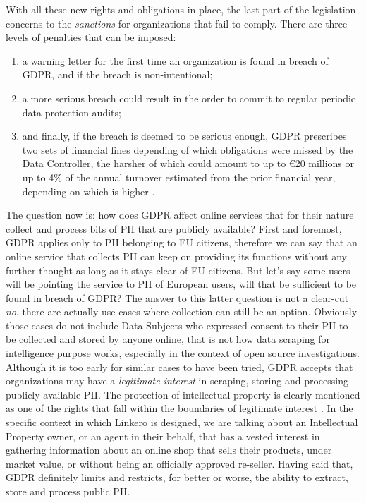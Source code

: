 With all these new rights and obligations in place, the last part of the
legislation concerns to the \emph{sanctions} for organizations that fail to
comply. There are three levels of penalties that can be imposed:
\begin{enumerate}
  \item a warning letter for the first time an organization is found in breach
  of GDPR, and if the breach is non-intentional;
  \item a more serious breach could result in the order to commit to regular
  periodic data protection audits;
  \item and finally, if the breach is deemed to be serious enough, GDPR
  prescribes two sets of financial fines depending of which obligations were
  missed by the Data Controller, the harsher of which could amount to up to
  \euro20 millions or up to 4\% of the annual turnover estimated from the prior
  financial year, depending on which is higher \cite{EU18}.
\end{enumerate}

The question now is: how does GDPR affect online services that for their
nature collect and process bits of PII that are publicly available? First and
foremost, GDPR applies only to PII belonging to EU citizens, therefore we can say
that an online service that collects PII can keep on providing its functions
without any further thought as long as it stays clear of EU citizens. But let's
say some users will be pointing the service to PII of European users, will that
be sufficient to be found in breach of GDPR? The answer to this latter question
is not a clear-cut \emph{no}, there are actually use-cases where collection can
still be an option. Obviously those cases do not include Data Subjects
who expressed consent to their PII to be collected and stored by anyone online,
that is not how data scraping for intelligence purpose works, especially in the
context of open source investigations. Although it is too early for similar
cases to have been tried, GDPR accepts that organizations may have a
\emph{legitimate interest} in scraping, storing and processing publicly
available PII. The protection of intellectual property is clearly
mentioned as one of the rights that fall within the boundaries of legitimate
interest \cite{EU18}. In the specific context in which Linkero is designed, we
are talking about an Intellectual Property owner, or an agent in their behalf,
that has a vested interest in gathering information about an online shop that
sells their products, under market value, or without being an officially
approved re-seller. Having said that, GDPR definitely limits and restricts, for
better or worse, the ability to extract, store and process public PII.

